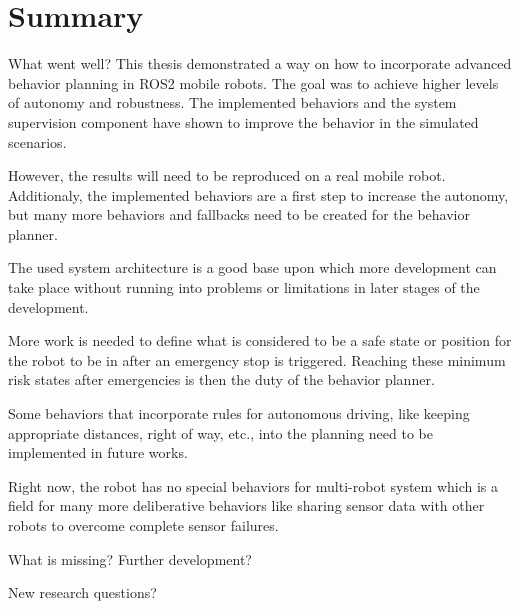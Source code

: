 \chapter{Summary}
\label{cha:diskussion}

What went well? 
This thesis demonstrated a way on how to incorporate advanced behavior planning in ROS2 mobile robots. The goal was to achieve higher levels of autonomy and robustness. The implemented behaviors and the system supervision component have shown to improve the behavior in the simulated scenarios.

However, the results will need to be reproduced on a real mobile robot. Additionaly, the implemented behaviors are a first step to increase the autonomy, but many more behaviors and fallbacks need to be created for the behavior planner. 

The used system architecture is a good base upon which more development can take place without running into problems or limitations in later stages of the development. 

More work is needed to define what is considered to be a safe state or position for the robot to be in after an emergency stop is triggered. Reaching these minimum risk states after emergencies is then the duty of the behavior planner. 

Some behaviors that incorporate rules for autonomous driving, like keeping appropriate distances, right of way, etc., into the planning need to be implemented in future works.

Right now, the robot has no special behaviors for multi-robot system which is a field for many more deliberative behaviors like sharing sensor data with other robots to overcome complete sensor failures. 

What is missing? Further development?


New research questions?



